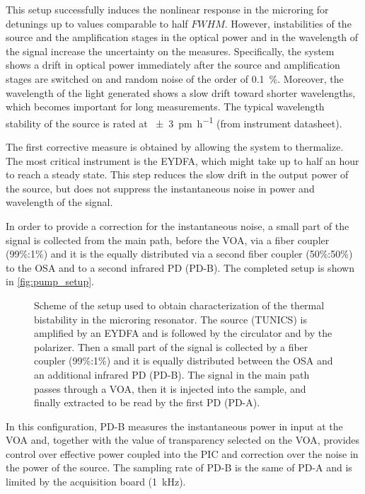 This setup successfully induces the nonlinear response in the microring for detunings up to values comparable to half $FWHM$.
However, instabilities of the source and the amplification stages in the optical power and in the wavelength of the signal increase the uncertainty on the measures.
Specifically, the system shows a drift in optical power immediately after the source and amplification stages are switched on and random noise of the order of \SI{0.1}{\percent}.
Moreover, the wavelength of the light generated shows a slow drift toward shorter wavelengths, which becomes important for long measurements.
The typical wavelength stability of the source is rated at \SI[per-mode=symbol]{+-3}{\pico\meter\per\hour} (from instrument datasheet).

The first corrective measure is obtained by allowing the system to thermalize.
The most critical instrument is the \ac{EYDFA}, which might take up to half an hour to reach a steady state.
This step reduces the slow drift in the output power of the source, but does not suppress the instantaneous noise in power and wavelength of the signal.

In order to provide a correction for the instantaneous noise, a small part of the signal is collected from the main path, before the VOA, via a fiber coupler (99\%:1\%) and it is the equally distributed via a second fiber coupler (50\%:50\%) to the OSA and to a second infrared \ac{PD} (PD-B).
The completed setup is shown in \autoref{fig:pump_setup}.

\begin{figure}[hbtp]
	\centering
	
	\caption{Scheme of the setup used to obtain characterization of the thermal bistability in the microring resonator.
		The source (TUNICS) is amplified by an \acs{EYDFA} and is followed by the circulator and by the polarizer.
		Then a small part of the signal is collected by a fiber coupler (99\%:1\%) and it is equally distributed between the OSA and an additional infrared \ac{PD} (PD-B).
		The signal in the main path passes through a \acf{VOA}, then it is injected into the sample, and finally extracted to be read by the first \ac{PD} (PD-A).
		}
	\label{fig:pump_setup}
\end{figure}

In this configuration, PD-B measures the instantaneous power in input at the VOA and, together with the value of transparency selected on the VOA, provides control over effective power coupled into the \ac{PIC} and correction over the noise in the power of the source.
The sampling rate of PD-B is the same of PD-A and is limited by the acquisition board (\SI{1}{\kHz}).

